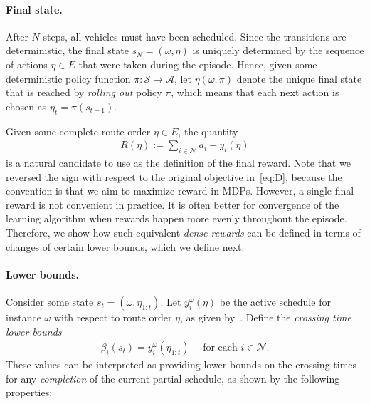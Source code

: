 \documentclass{report}
\theoremstyle{definition}
\theoremstyle{plain}
\begin{document}
\paragraph{Final state.}
After $N$ steps, all vehicles must have been scheduled. Since the transitions
are deterministic, the final state $s_N = (\omega,\eta)$ is uniquely determined
by the sequence of actions $\eta \in E$ that were taken during the episode.
Hence, given some deterministic policy function
$\pi : \mathcal{S} \rightarrow \mathcal{A}$, let $\eta(\omega, \pi)$ denote the
unique final state that is reached by \emph{rolling out} policy $\pi$, which
means that each next action is chosen as $\eta_t = \pi(s_{t-1})$.

Given some complete route order $\eta \in E$, the quantity
\begin{align}
  R(\eta) := \sum_{i \in \mathcal{N}} a_i - y_i(\eta)
\end{align}
is a natural candidate to use as the definition of the final reward. Note that
we reversed the sign with respect to the original objective in~\eqref{eq:D}, because the
convention is that we aim to maximize reward in MDPs.
%
However, a single final reward is not convenient in practice. It is often better
for convergence of the learning algorithm when rewards happen more evenly
throughout the episode.
%
Therefore, we show how such equivalent \emph{dense rewards} can be defined in
terms of changes of certain lower bounds, which we define next.


\paragraph{Lower bounds.}
Consider some state $s_t = (\omega, \eta_{1:t})$. Let $y^\omega_i(\eta)$ be the active
schedule for instance $\omega$ with respect to route order $\eta$, as given
by~. Define the \emph{crossing time lower bounds}
\begin{align}
  \beta_i(s_t) = y^\omega_i(\eta_{1:t}) \quad \text{ for each } i \in \mathcal{N} .
\end{align}
%
These values can be interpreted as providing lower bounds on the crossing times
for any \emph{completion} of the current partial schedule, as shown by the following
properties:
\end{document}

